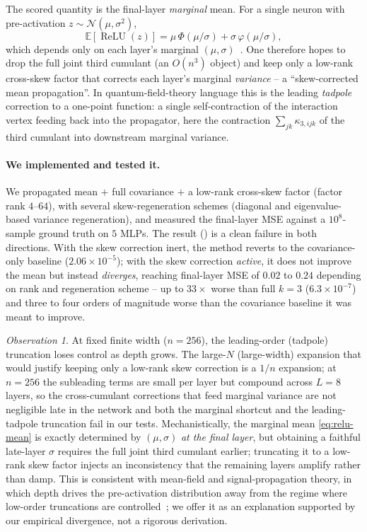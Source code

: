\documentclass[11pt]{article}
\newcommand{\E}{\mathbb{E}}
\newcommand{\relu}{\operatorname{ReLU}}
\newcommand{\N}{\mathcal{N}}
\newcommand{\Phinorm}{\Phi}
\newcommand{\phinorm}{\varphi}
\theoremstyle{remark}
\newtheorem{observation}{Observation}
\begin{document}
The scored quantity is the final-layer \emph{marginal} mean. For a single neuron
with pre-activation $z\sim\N(\mu,\sigma^2)$,
\begin{equation}
  \E[\relu(z)] = \mu\,\Phinorm(\mu/\sigma) + \sigma\,\phinorm(\mu/\sigma),
  \label{eq:relu-mean}
\end{equation}
which depends only on each layer's marginal $(\mu,\sigma)$~\cite{frey1999variational,
wright2024analytic}. One therefore hopes to drop the full joint third cumulant
(an $O(n^3)$ object) and keep only a low-rank cross-skew factor that corrects
each layer's marginal \emph{variance} -- a ``skew-corrected mean propagation''.
In quantum-field-theory language this is the leading \emph{tadpole} correction
to a one-point function: a single self-contraction of the interaction vertex
feeding back into the propagator, here the contraction $\sum_{jk}\kappa_{3,ijk}$
of the third cumulant into downstream marginal variance.

\paragraph{We implemented and tested it.}
We propagated mean $+$ full covariance $+$ a low-rank cross-skew factor (factor
rank $4$--$64$), with several skew-regeneration schemes (diagonal and
eigenvalue-based variance regeneration), and measured the final-layer MSE
against a $10^8$-sample ground truth on $5$ MLPs. The result
() is a clean failure in both directions. With the skew
correction inert, the method reverts to the covariance-only baseline
($2.06\times10^{-5}$); with the skew correction \emph{active}, it does not
improve the mean but instead \emph{diverges}, reaching final-layer MSE of $0.02$
to $0.24$ depending on rank and regeneration scheme -- up to $33\times$ worse
than full $k{=}3$ ($6.3\times10^{-7}$) and three to four orders of magnitude
worse than the covariance baseline it was meant to improve.

\begin{observation}
At fixed finite width ($n=256$), the leading-order (tadpole) truncation loses
control as depth grows. The large-$N$ (large-width) expansion that would justify
keeping only a low-rank skew correction is a $1/n$ expansion; at $n=256$ the
subleading terms are small per layer but compound across $L=8$ layers, so the
cross-cumulant corrections that feed marginal variance are not negligible late
in the network and both the marginal shortcut and the leading-tadpole truncation
fail in our tests. Mechanistically, the marginal mean \eqref{eq:relu-mean} is
exactly determined by $(\mu,\sigma)$ \emph{at the final layer}, but obtaining a
faithful late-layer $\sigma$ requires the full joint third cumulant earlier;
truncating it to a low-rank skew factor injects an inconsistency that the
remaining layers amplify rather than damp. This is consistent with mean-field and
signal-propagation theory, in which depth drives the pre-activation distribution
away from the regime where low-order
truncations are controlled~\cite{schoenholz2017deep, poole2016exponential,
wright2024analytic}; we offer it as an explanation supported by our empirical
divergence, not a rigorous derivation.
\end{observation}
\end{document}
